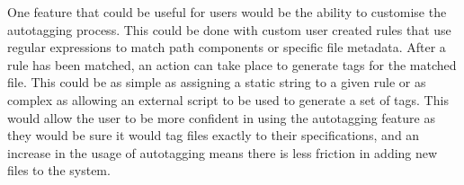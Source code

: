 One feature that could be useful for users would be the ability to customise
the autotagging process. This could be done with custom user created rules that
use regular expressions to match path components or specific file metadata.
After a rule has been matched, an action can take place to generate tags for
the matched file. This could be as simple as assigning a static string to a
given rule or as complex as allowing an external script to be used to generate
a set of tags. This would allow the user to be more confident in using the
autotagging feature as they would be sure it would tag files exactly to their
specifications, and an increase in the usage of autotagging means there is less
friction in adding new files to the system.
